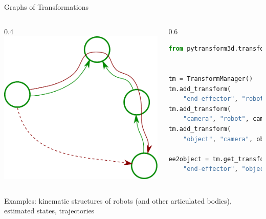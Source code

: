 \documentclass[14pt]{beamer}
\begin{document}
\begin{frame}{Graphs of Transformations}
\begin{columns}
\begin{column}{0.4\textwidth}
\includegraphics[width=\textwidth]{images/transform_graph}
\end{column}
\begin{column}{0.6\textwidth}
\begin{lstlisting}[language=Python]
from pytransform3d.transform_manager import TransformManager


tm = TransformManager()
tm.add_transform(
    "end-effector", "robot", ee2robot)
tm.add_transform(
    "camera", "robot", cam2robot)
tm.add_transform(
    "object", "camera", object2cam)

ee2object = tm.get_transform(
    "end-effector", "object")
\end{lstlisting}
\end{column}
\end{columns}

Examples: kinematic structures of robots (and other articulated bodies),
estimated states, trajectories
\end{frame}
\end{document}
